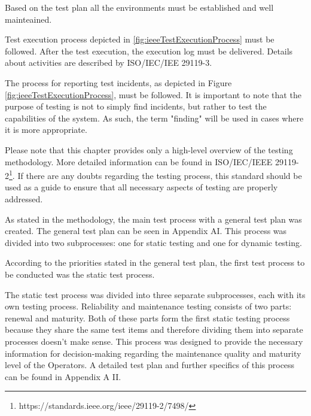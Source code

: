 Based on the test plan all the environments must be established and well mainteained.

Test execution process depicted in \ref{fig:ieeeTestExecutionProcess} must be followed. After the test execution, the execution log must be delivered. Details about activities are described by ISO/IEC/IEE 29119-3.


The process for reporting test incidents, as depicted in Figure \ref{fig:ieeeTestExecutionProcess}, must be followed. It is important to note that the purpose of testing is not to simply find incidents, but rather to test the capabilities of the system. As such, the term "finding" will be used in cases where it is more appropriate.

Please note that this chapter provides only a high-level overview of the testing methodology. More detailed information can be found in ISO/IEC/IEEE 29119-2\footnote[5]{https://standards.ieee.org/ieee/29119-2/7498/}. If there are any doubts regarding the testing process, this standard should be used as a guide to ensure that all necessary aspects of testing are properly addressed.

As stated in the methodology, the main test process with a general test plan was created. The general test plan can be seen in Appendix AI. This process was divided into two subprocesses: one for static testing and one for dynamic testing.

According to the priorities stated in the general test plan, the first test process to be conducted was the static test process.


The static test process was divided into three separate subprocesses, each with its own testing process.
Reliability and maintenance testing consists of two parts: renewal and maturity. Both of these parts form the first static testing process because they share the same test items and therefore dividing them into separate processes doesn't make sense. This process was designed to provide the necessary information for decision-making regarding the maintenance quality and maturity level of the Operators. A detailed test plan and further specifics of this process can be found in Appendix A II.

